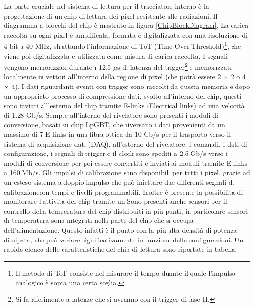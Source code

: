 La parte cruciale nel sistema di lettura per il tracciatore interno è la progettazione di un chip di lettura dei pixel resistente alle radiazioni. Il diagramma a blocchi del chip è mostrato in figura \ref{ChipBlockDiagram}. 
La carica raccolta su ogni pixel è amplificata, formata e digitalizzata con una risoluzione di 4 bit a 40 MHz, sfruttando l'informazione di ToT (Time Over Threshold)\footnote{Il metodo di ToT consiste nel misurare il tempo duante il quale l'impulso analogico è sopra una certa soglia.}, che viene poi digitalizzata e utilizzata come misura di carica raccolta. 
I segnali vengono memorizzati durante i 12.5 $\mu$s di latenza del trigger\footnote{Si fa riferimento a latenze che si avranno con il trigger di fase II.} e memorizzati localmente in vettori all'interno della regione di pixel (che potrà essere 2 $\times$ 2 o 4 $\times$ 4). 
I dati riguardanti eventi con trigger sono raccolti da questa memoria e dopo un appropriato processo di compressione dati, svolto all'interno del chip, questi sono inviati all'esterno del chip tramite E-links (Electrical links) ad una velocità di 1.28 Gb/s. 
Sempre all'interno del rivelatore sono presenti i moduli di conversione, basati su chip LpGBT, che riversano i dati provenienti da un massimo di 7  E-links in una fibra ottica da 10 Gb/s per il trasporto verso il sistema di acquisizione dati (DAQ), all'esterno del rivelatore. 
I comandi, i dati di configurazione, i segnali di trigger e il clock sono spediti a 2.5 Gb/s verso i moduli di conversione per poi essere convertiti e inviati ai moduli tramite E-links a 160 Mb/s. 
Gli impulsi di calibrazione sono disponibili per tutti i pixel, grazie ad un esteso sistema a doppio impulso che può iniettare due differenti segnali di calibrazionecon tempi e livelli programmabili. 
Inoltre è presente la possibilità di monitorare l'attività del chip tramite un 
Sono presenti anche sensori per il controllo della temperatura del chip distribuiti in più punti, in particolare sensori di temperatura sono integrati nella parte del chip che si occupa dell'alimentazione. Questo infatti è il punto con la più alta densità di potenza dissipata, che può variare significativamente in funzione delle configurazioni. 
Un rapido elenco delle caratteristiche del chip di lettura sono riportate in tabella:

